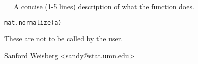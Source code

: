 \begin{Description}\relax
~~ A concise (1-5 lines) description of what the function does. ~~
\end{Description}
\begin{Usage}
\begin{verbatim}
mat.normalize(a)
\end{verbatim}
\end{Usage}
\begin{Details}\relax
These are not to be called by the user.
\end{Details}
\begin{Author}\relax
Sanford Weisberg <sandy@stat.umn.edu>
\end{Author}

